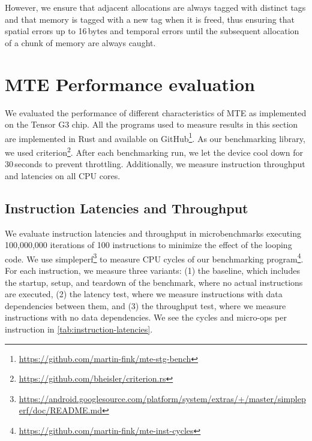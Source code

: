 However, we ensure that adjacent allocations are always tagged with distinct tags and that memory is tagged with a new tag when it is freed, thus ensuring that spatial errors up to 16\,bytes and temporal errors until the subsequent allocation of a chunk of memory are always caught.


\section{MTE Performance evaluation}
\label{sec:mte-performance-evaluation}

We evaluated the performance of different characteristics of \ac{MTE} as implemented on the Tensor G3 chip.
All the programs used to measure results in this section are implemented in Rust and available on GitHub\footnote{\url{https://github.com/martin-fink/mte-stg-bench}}.
As our benchmarking library, we used criterion\footnote{\url{https://github.com/bheisler/criterion.rs}}.
After each benchmarking run, we let the device cool down for 30\,seconds to prevent throttling.
Additionally, we measure instruction throughput and latencies on all CPU cores.

\subsection{Instruction Latencies and Throughput}\label{subsec:instruction-latencies-and-throughput}

We evaluate instruction latencies and throughput in microbenchmarks executing 100,000,000 iterations of 100 instructions to minimize the effect of the looping code.
We use simpleperf\footnote{\url{https://android.googlesource.com/platform/system/extras/+/master/simpleperf/doc/README.md}} to measure CPU cycles of our benchmarking program\footnote{\url{https://github.com/martin-fink/mte-inst-cycles}}.
For each instruction, we measure three variants: (1) the baseline, which includes the startup, setup, and teardown of the benchmark, where no actual instructions are executed, (2) the latency test, where we measure instructions with data dependencies between them, and (3) the throughput test, where we measure instructions with no data dependencies.
We see the cycles and micro-ops per instruction in \cref{tab:instruction-latencies}.

